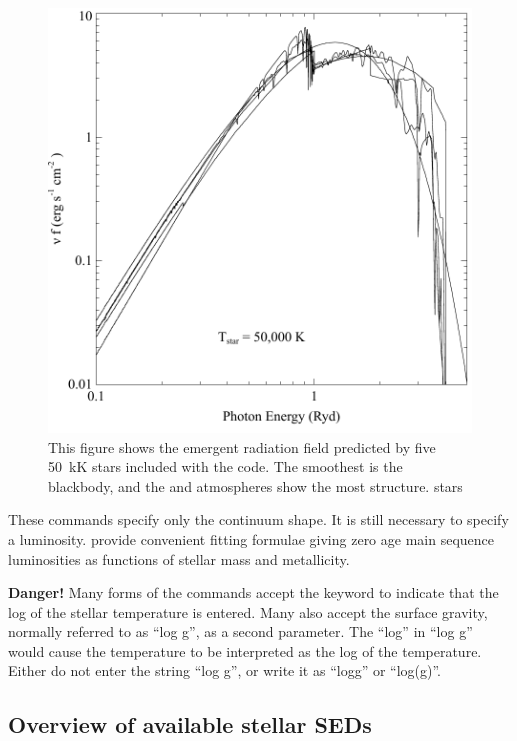 \begin{figure}
\centering
\includegraphics[scale=0.9]{StarsContinuum}
\caption[Stellar radiation fields]
{\label{fig:StarsContinuum}This figure shows the emergent
radiation field predicted by five 50~kK 
stars included with the code.  The smoothest is the blackbody, and the
\citet{Kurucz1991} and \citet{Rauch1997} atmospheres show the most structure.  stars}
\end{figure}

These commands specify only the continuum shape.
It is still necessary to specify a luminosity.
\citet{Tout1996} provide convenient fitting
formulae giving zero age main sequence luminosities as
functions of stellar mass and metallicity.

{\bf Danger!}  Many forms of the  commands
accept the  keyword to indicate that the log of the stellar temperature
is entered.  Many also accept the surface gravity, normally referred to as
``log g'', as a second parameter.  The ``log'' in ``log g'' would cause the
temperature to be interpreted as the log of the temperature.  Either
do not enter the string ``log g'', or write it as ``logg'' or ``log(g)''.

\subsection{Overview of available stellar SEDs}

